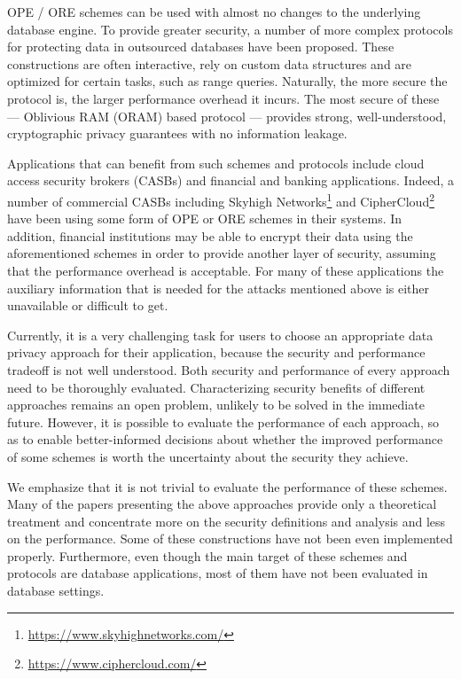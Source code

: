 	OPE / ORE schemes can be used with almost no changes to the underlying database engine.
	To provide greater security, a number of more complex protocols for protecting data in outsourced databases have been proposed.
	These constructions are often interactive, rely on custom data structures and are optimized for certain tasks, such as range queries.
	Naturally, the more secure the protocol is, the larger performance overhead it incurs.
	The most secure of these --- Oblivious RAM (ORAM) based protocol --- provides strong, well-understood, cryptographic privacy guarantees with no information leakage.

	Applications that can benefit from such schemes and protocols include cloud access security brokers (CASBs) and financial and banking applications.
	Indeed, a number of commercial CASBs including Skyhigh Networks\footnote{\url{https://www.skyhighnetworks.com/}} and CipherCloud\footnote{\url{https://www.ciphercloud.com/}} have been using some form of OPE or ORE schemes in their systems.
	In addition, financial institutions may be able to encrypt their data using the aforementioned schemes in order to provide another layer of security, assuming that the performance overhead is acceptable.
	For many of these applications the auxiliary information that is needed for the attacks mentioned above is either unavailable or difficult to get.

	Currently, it is a very challenging task for users to choose an appropriate data privacy approach for their application, because the security and performance tradeoff is not well understood.
	Both security and performance of every approach need to be thoroughly evaluated.
	Characterizing security benefits of different approaches remains an open problem, unlikely to be solved in the immediate future.
	However, it is possible to evaluate the performance of each approach, so as to enable better-informed decisions about whether the improved performance of some schemes is worth the uncertainty about the security they achieve.

	We emphasize that it is not trivial to evaluate the performance of these schemes.
	Many of the papers presenting the above approaches provide only a theoretical treatment and concentrate more on the security definitions and analysis and less on the performance.
	Some of these constructions have not been even implemented properly.
	Furthermore, even though the main target of these schemes and protocols are database applications, most of them have not been evaluated in database settings.

